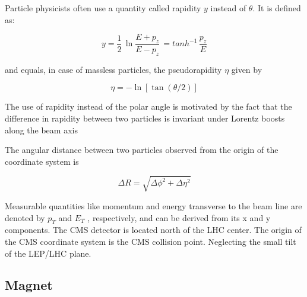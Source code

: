 Particle physicists often use a quantity called rapidity
$y$ instead of $\theta$. It is defined as:

\begin{equation}
\label{eq:CMSqd1}
 y = \frac{1}{2} \,\ln \frac{E + p_z}{E - p_z} \, = tanh^{-1} \,\frac{p_z}{E}
\end{equation}

and equals, in case of massless particles, the pseudorapidity $\eta $ given by

\begin{equation}
\label{eq:CMSqd2}
 \eta = -\ln[\tan(\theta/2)]
\end{equation}

The use of rapidity instead of the polar angle is motivated by the fact that the difference 
in rapidity between two particles is invariant under Lorentz boosts along the beam axis

The angular distance between two particles observed from the origin of the
coordinate system is

\begin{equation}
\label{eq:CMSqd3}
\Delta R = \sqrt{\Delta \phi^2 + \Delta \eta^2} 
\end{equation}

Measurable quantities like momentum and energy transverse to the beam line
are denoted by $p_T$ and $E_T$ , respectively, and can be derived from its x and
y components. The CMS detector is located north of the LHC center. The
origin of the CMS coordinate system is the CMS collision point. Neglecting
the small tilt of the LEP/LHC plane.

\subsection{Magnet}

